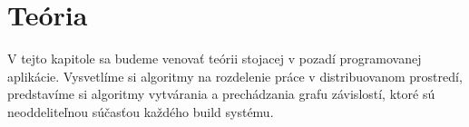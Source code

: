\chapter{Te\'{o}ria}
\label{ch:theory}

V tejto kapitole sa budeme venovať teórii stojacej v pozadí programovanej aplikácie.
Vysvetlíme si algoritmy na rozdelenie práce v distribuovanom prostredí, predstavíme
si algoritmy vytvárania a prechádzania grafu závislostí, ktoré sú neoddeliteľnou
súčasťou každého build systému.
